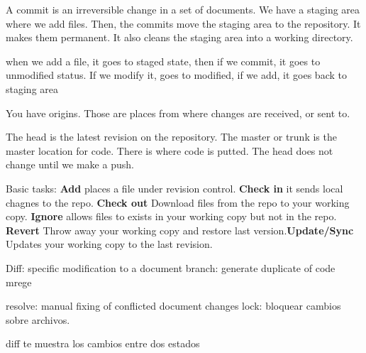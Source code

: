 A commit is an irreversible change in a set of documents. We have a staging area where we add files. Then, the commits move the staging area to the repository. It makes them permanent. It also cleans the staging area into a working directory.

when we add a file, it goes to staged state, then if we commit, it goes to unmodified status. If we modify it, goes to modified, if we add, it goes back to staging area

You have origins. Those are places from where changes are received, or sent to.

The head is the latest revision on the repository. The master or trunk is the master location for code. There is where code is putted. The head does not change until we make a push.

Basic tasks: \textbf{Add} places a file under revision control. \textbf{Check in} it sends local chagnes to the repo. \textbf{Check out} Download files from the repo to your working copy. \textbf{Ignore} allows files to exists in your working copy but not in the repo. \textbf{ Revert} Throw away your working copy and restore last version.\textbf{Update/Sync} Updates your working copy to the last revision.

Diff: specific modification to a document
branch: generate duplicate of code
mrege

resolve: manual fixing of conflicted document changes
lock: bloquear cambios sobre archivos.

diff te muestra los cambios entre dos estados


